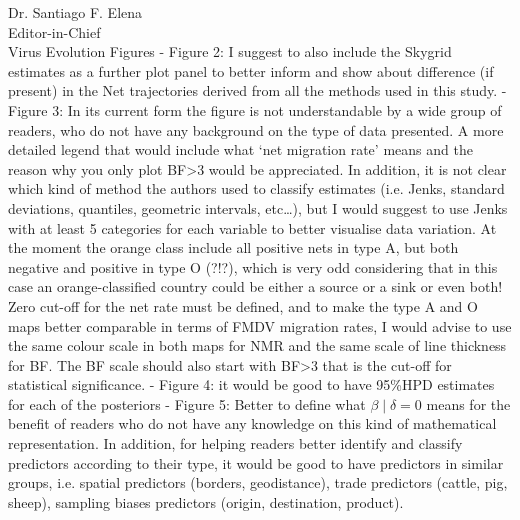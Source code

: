 \documentclass[12pt, a4paper]{letter} %
\begin{document}
\begin{letter}{
	Dr. Santiago F. Elena\\
    Editor-in-Chief \\
    Virus Evolution
}
Figures
-       Figure 2: I suggest to also include the Skygrid estimates as a further plot panel to better inform and show about difference (if present) in the Net trajectories derived from all the methods used in this study.
-       Figure 3: In its current form the figure is not understandable by a wide group of readers, who do not have any background on the type of data presented.
A more detailed legend that would include what ‘net migration rate’ means and the reason why you only plot BF>3 would be appreciated.
In addition, it is not clear which kind of method the authors used to classify estimates (i.e. Jenks, standard deviations, quantiles, geometric intervals, etc…), but I would suggest to use Jenks with at least 5 categories for each variable to better visualise data variation.
At the moment the orange class include all positive nets in type A, but both negative and positive in type O (?!?), which is very odd considering that in this case an orange-classified country could be either a source or a sink or even both!
Zero cut-off for the net rate must be defined, and to make the type A and O maps better comparable in terms of FMDV migration rates, I would advise to use the same colour scale in both maps for NMR and the same scale of line thickness for BF.
The BF scale should also start with BF>3 that is the cut-off for statistical significance.
-       Figure 4: it would be good to have 95\%HPD estimates for each of the posteriors
-       Figure 5: Better to define what $\beta \mid \delta = 0$ means for the benefit of readers who do not have any knowledge on this kind of mathematical representation.
In addition, for helping readers better identify and classify predictors according to their type, it would be good to have predictors in similar groups, i.e. spatial predictors (borders, geodistance), trade predictors (cattle, pig, sheep), sampling biases predictors (origin, destination, product).

\clearpage



\end{letter}
\end{document}
